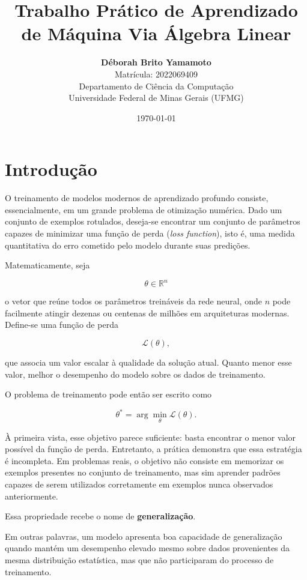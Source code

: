 \documentclass[12pt, a4paper]{article}
\begin{document}
\title{\textbf{Trabalho Prático de Aprendizado de Máquina Via Álgebra Linear}}

\author{\textbf{Déborah Brito Yamamoto} \\ 
Matrícula: 2022069409 \\
Departamento de Ciência da Computação \\
Universidade Federal de Minas Gerais (UFMG)}
\date{\today}
\maketitle

\section{Introdução}

O treinamento de modelos modernos de aprendizado profundo consiste, essencialmente, em um grande problema de otimização numérica. Dado um conjunto de exemplos rotulados, deseja-se encontrar um conjunto de parâmetros capazes de minimizar uma função de perda (\textit{loss function}), isto é, uma medida quantitativa do erro cometido pelo modelo durante suas predições.

Matematicamente, seja

\[
\theta \in \mathbb{R}^{n}
\]

o vetor que reúne todos os parâmetros treináveis da rede neural, onde $n$ pode facilmente atingir dezenas ou centenas de milhões em arquiteturas modernas. Define-se uma função de perda

\[
\mathcal{L}(\theta),
\]

que associa um valor escalar à qualidade da solução atual. Quanto menor esse valor, melhor o desempenho do modelo sobre os dados de treinamento.

O problema de treinamento pode então ser escrito como

\[
\theta^{*}
=
\arg\min_{\theta}
\mathcal{L}(\theta).
\]

À primeira vista, esse objetivo parece suficiente: basta encontrar o menor valor possível da função de perda. Entretanto, a prática demonstra que essa estratégia é incompleta. Em problemas reais, o objetivo não consiste em memorizar os exemplos presentes no conjunto de treinamento, mas sim aprender padrões capazes de serem utilizados corretamente em exemplos nunca observados anteriormente.

Essa propriedade recebe o nome de \textbf{generalização}.

Em outras palavras, um modelo apresenta boa capacidade de generalização quando mantém um desempenho elevado mesmo sobre dados provenientes da mesma distribuição estatística, mas que não participaram do processo de treinamento.
\end{document}
